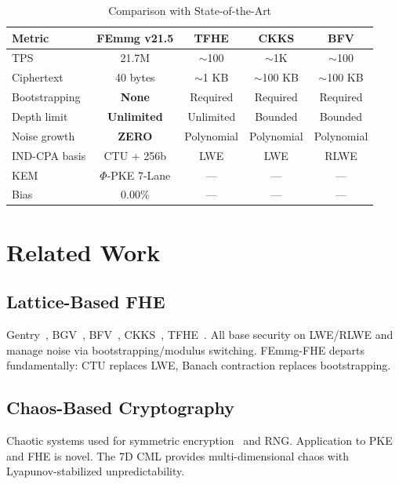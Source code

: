 \documentclass[11pt,a4paper]{article}
\begin{document}
\begin{table}[h]
\centering
\begin{tabular}{|l|c|c|c|c|}
\hline
\textbf{Metric} & \textbf{FEmmg v21.5} & \textbf{TFHE} & \textbf{CKKS} & \textbf{BFV} \\
\hline
TPS & 21.7M & $\sim$100 & $\sim$1K & $\sim$100 \\
Ciphertext & 40 bytes & $\sim$1 KB & $\sim$100 KB & $\sim$100 KB \\
Bootstrapping & \textbf{None} & Required & Required & Required \\
Depth limit & \textbf{Unlimited} & Unlimited & Bounded & Bounded \\
Noise growth & \textbf{ZERO} & Polynomial & Polynomial & Polynomial \\
IND-CPA basis & CTU + 256b & LWE & LWE & RLWE \\
KEM & $\Phi$-PKE 7-Lane & --- & --- & --- \\
Bias & 0.00\% & --- & --- & --- \\
\hline
\end{tabular}
\caption{Comparison with State-of-the-Art}
\end{table}

\section{Related Work}

\subsection{Lattice-Based FHE}

Gentry~\cite{gentry09}, BGV~\cite{bgv14}, BFV~\cite{bfv12}, CKKS~\cite{ckks17}, TFHE~\cite{tfhe20}. All base security on LWE/RLWE and manage noise via bootstrapping/modulus switching. FEmmg-FHE departs fundamentally: CTU replaces LWE, Banach contraction replaces bootstrapping.

\subsection{Chaos-Based Cryptography}

Chaotic systems used for symmetric encryption~\cite{strogatz2018} and RNG. Application to PKE and FHE is novel. The 7D CML provides multi-dimensional chaos with Lyapunov-stabilized unpredictability.
\end{document}
